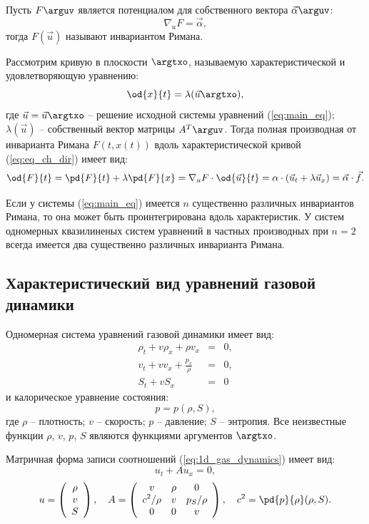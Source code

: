 \documentclass[14pt]{extarticle}
\begin{document}
\begin{dfn}
	Пусть $F\arguv$ является потенциалом для собственного вектора $\vec{\alpha}\arguv$:
	\[
	\nabla_{u} F = \vec{\alpha},
	\]
	тогда $F(\vec{u})$ называют \alert{инвариантом Римана}.
\end{dfn}


Рассмотрим кривую в плоскости $\argtxo$, называемую \alert{характеристической} и удовлетворяющую уравнению:
\begin{equation}
	\label{eq:eq_ch_dir}
	\od{x}{t} = \lambda(\vec{u}\argtxo),
\end{equation}
где $\vec{u} = \vec{u}\argtxo$ -- решение исходной системы уравнений (\ref{eq:main_eq}); $\lambda(\vec{u})$ -- собственный вектор матрицы $A^T\arguv$.
Тогда полная производная от инварианта Римана $F(t, x(t))$ вдоль характеристической кривой (\ref{eq:eq_ch_dir}) имеет вид:
\[
\od{F}{t} = \pd{F}{t} + \lambda \pd{F}{x} =  \nabla_{u} F \cdot \od{\vec{u}}{t} =  
\alpha \cdot( \vec{u}_t  + \lambda \vec{u}_x ) = \vec{\alpha} \cdot \vec{f}.
\]

Если у системы (\ref{eq:main_eq}) имеется $n$ существенно различных инвариантов Римана, то она может быть проинтегрирована вдоль характеристик. У систем одномерных квазилиненых систем уравнений в частных производных при $n=2$ всегда имеется два существенно различных инварианта Римана.

\subsection{Характеристический вид уравнений газовой динамики }

Одномерная система уравнений газовой динамики имеет вид:
\begin{eqnarray}
	\label{eq:1d_gas_dynamics}
\nonumber	\rho_t + v\rho_x + \rho v_x & = & 0,\\
	v_t + v v_x + \frac{p_x}{\rho} & = & 0,\\
\nonumber	S_t + v S_x & = & 0 
\end{eqnarray}
и калорическое уравнение состояния:
\[
p = p(\rho, S),
\]
где $\rho$ -- плотность; $v$ -- скорость; $p$ -- давление; $S$ -- энтропия. Все неизвестные функции $\rho$, $v$, $p$, $S$ являются функциями аргументов $\argtxo$.

Матричная форма записи соотношений (\ref{eq:1d_gas_dynamics}) имеет вид:
\[
	u_t + A u_x = 0,
\]
\[
	u = \left(
	\begin{array}{c}
		\rho\\ v\\ S
	\end{array}
	\right),\quad
	A = \left(
	\begin{array}{ccc}
		v & \rho & 0\\
		\displaystyle c^2/\rho & v & p_S/\rho\\
		0 & 0 & v\\
	\end{array}
	\right),\quad
	c^2 = \pd{p}{\rho}(\rho,S).
\]	
\end{document}
